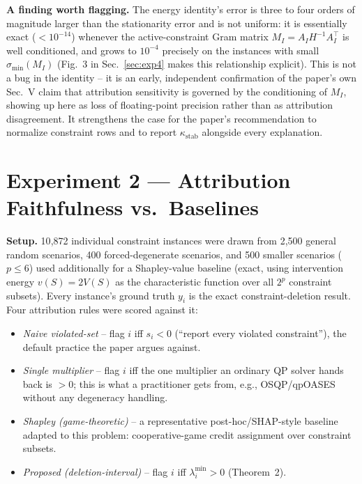 \documentclass[11pt]{article}
\begin{document}
\textbf{A finding worth flagging.} The energy identity's error is three to
four orders of magnitude larger than the stationarity error and is not
uniform: it is essentially exact ($<10^{-14}$) whenever the active-constraint
Gram matrix $M_I=A_IH^{-1}A_I^\top$ is well conditioned, and grows to
$10^{-4}$ precisely on the instances with small $\sigma_{\min}(M_I)$ (Fig.~3
in Sec.~\ref{sec:exp4} makes this relationship explicit). This is not a bug in
the identity -- it is an early, independent confirmation of the paper's own
Sec.~V claim that attribution sensitivity is governed by the conditioning of
$M_I$, showing up here as loss of floating-point precision rather than as
attribution disagreement. It strengthens the case for the paper's
recommendation to normalize constraint rows and to report $\kappa_{\mathrm{stab}}$
alongside every explanation.

\section{Experiment 2 --- Attribution Faithfulness vs.\ Baselines}
\label{sec:exp2}

\textbf{Setup.} 10{,}872 individual constraint instances were drawn from
2{,}500 general random scenarios, 400 forced-degenerate scenarios, and 500
smaller scenarios ($p\le 6$) used additionally for a Shapley-value baseline
(exact, using intervention energy $v(S)=2V(S)$ as the characteristic function
over all $2^p$ constraint subsets). Every instance's ground truth $y_i$ is the
exact constraint-deletion result. Four attribution rules were scored against
it:
\begin{itemize}[leftmargin=1.6em]
  \item \textit{Naive violated-set} -- flag $i$ iff $s_i<0$ (``report every
        violated constraint''), the default practice the paper argues
        against.
  \item \textit{Single multiplier} -- flag $i$ iff the one multiplier an
        ordinary QP solver hands back is $>0$; this is what a practitioner
        gets from, e.g., OSQP/qpOASES without any degeneracy handling.
  \item \textit{Shapley (game-theoretic)} -- a representative post-hoc/SHAP-style
        baseline adapted to this problem: cooperative-game credit assignment
        over constraint subsets.
  \item \textit{Proposed (deletion-interval)} -- flag $i$ iff
        $\lambda_i^{\min}>0$ (Theorem~2).
\end{itemize}
\end{document}
